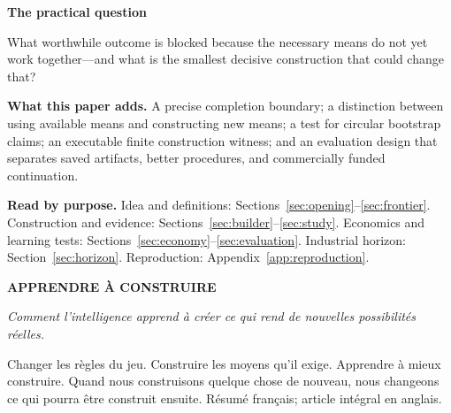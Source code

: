 \begin{practicebox}
\textbf{The practical question}\par
What worthwhile outcome is blocked because the necessary means do not yet work together---and what is the smallest decisive construction that could change that?
\end{practicebox}

\textbf{What this paper adds.} A precise completion boundary; a distinction between using available means and constructing new means; a test for circular bootstrap claims; an executable finite construction witness; and an evaluation design that separates saved artifacts, better procedures, and commercially funded continuation.

\textbf{Read by purpose.} Idea and definitions: Sections~\ref{sec:opening}--\ref{sec:frontier}. Construction and evidence: Sections~\ref{sec:builder}--\ref{sec:study}. Economics and learning tests: Sections~\ref{sec:economy}--\ref{sec:evaluation}. Industrial horizon: Section~\ref{sec:horizon}. Reproduction: Appendix~\ref{app:reproduction}.

\begingroup\small
\textbf{APPRENDRE \`A CONSTRUIRE}\par
\emph{Comment l'intelligence apprend \`a cr\'eer ce qui rend de nouvelles possibilit\'es r\'eelles.}\par
Changer les r\`egles du jeu. Construire les moyens qu'il exige. Apprendre \`a mieux construire. Quand nous construisons quelque chose de nouveau, nous changeons ce qui pourra \^etre construit ensuite. R\'esum\'e fran\c{c}ais; article int\'egral en anglais.
\endgroup
